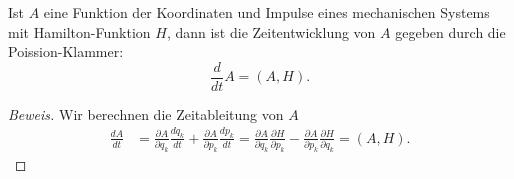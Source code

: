 \begin{satz}
\label{skript:zeitentwicklung-observable-klassisch}
Ist $A$ eine Funktion der Koordinaten und Impulse eines mechanischen Systems
mit Hamilton-Funktion $H$, dann ist die Zeitentwicklung von $A$ gegeben
durch die Poission-Klammer:
\begin{equation}
\frac{d}{dt}A
=
(A,H).
\label{skript:zeitentwicklung-poisson}
\end{equation}
\end{satz}

\begin{proof}[Beweis]
Wir berechnen die Zeitableitung von $A$
\begin{align*}
\frac{dA}{dt}
&=
\frac{\partial A}{\partial q_k}\frac{dq_k}{dt}
+
\frac{\partial A}{\partial p_k}\frac{dp_k}{dt}
=
\frac{\partial A}{\partial q_k}\frac{\partial H}{\partial p_k}
-
\frac{\partial A}{\partial p_k}\frac{\partial H}{\partial q_k}
=
(A,H).
\end{align*}
\end{proof}

